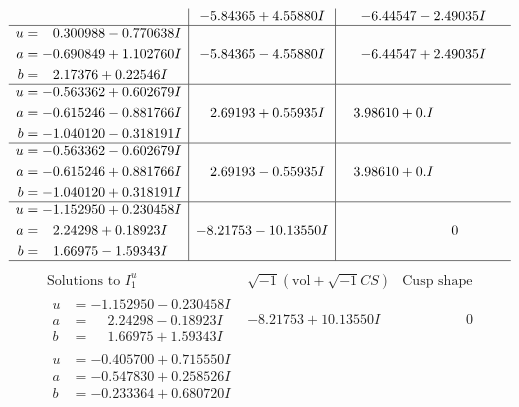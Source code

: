 \documentclass[1p]{elsarticle_modified}
\theoremstyle{definition}
\newcommand{\I}{\sqrt{-1}}
\begin{document}
$$\begin{array}{c|c|c}
 & -5.84365 + 4.55880 I & -6.44547 - 2.49035 I \\ \hline\begin{aligned}
u &= \phantom{-}0.300988 - 0.770638 I \\
a &= -0.690849 + 1.102760 I \\
b &= \phantom{-}2.17376 + 0.22546 I\end{aligned}
 & -5.84365 - 4.55880 I & -6.44547 + 2.49035 I \\ \hline\begin{aligned}
u &= -0.563362 + 0.602679 I \\
a &= -0.615246 - 0.881766 I \\
b &= -1.040120 - 0.318191 I\end{aligned}
 & \phantom{-}2.69193 + 0.55935 I & \phantom{-}3.98610 + 0. I\phantom{ +0.000000I} \\ \hline\begin{aligned}
u &= -0.563362 - 0.602679 I \\
a &= -0.615246 + 0.881766 I \\
b &= -1.040120 + 0.318191 I\end{aligned}
 & \phantom{-}2.69193 - 0.55935 I & \phantom{-}3.98610 + 0. I\phantom{ +0.000000I} \\ \hline\begin{aligned}
u &= -1.152950 + 0.230458 I \\
a &= \phantom{-}2.24298 + 0.18923 I \\
b &= \phantom{-}1.66975 - 1.59343 I\end{aligned}
 & -8.21753 - 10.13550 I & \phantom{-0.000000 } 0\\
 \hline 
 \end{array}$$\newpage$$\begin{array}{c|c|c}  
\text{Solutions to }I^u_{1}& \I (\text{vol} + \sqrt{-1}CS) & \text{Cusp shape}\\
 \hline 
\begin{aligned}
u &= -1.152950 - 0.230458 I \\
a &= \phantom{-}2.24298 - 0.18923 I \\
b &= \phantom{-}1.66975 + 1.59343 I\end{aligned}
 & -8.21753 + 10.13550 I & \phantom{-0.000000 } 0 \\ \hline\begin{aligned}
u &= -0.405700 + 0.715550 I \\
a &= -0.547830 + 0.258526 I \\
b &= -0.233364 + 0.680720 I\end{aligned}

\end{array}$$
\end{document}
